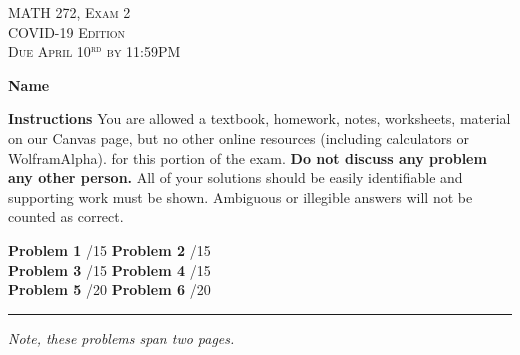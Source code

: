 \documentclass[12pt]{amsbook}
\begin{document}

\begin{center}
   \textsc{\large MATH 272, Exam 2}\\
   \textsc{COVID-19 Edition}\\
   \textsc{Due April 10$^\textrm{rd}$ by 11:59PM}
\end{center}
\vspace{1cm}

\noindent\textbf{Name} \; \underline{\hspace{8cm}}

\vspace{1cm}

\noindent\textbf{Instructions} \; You are allowed a textbook, homework, notes, worksheets, material on our Canvas page, but no other online resources (including calculators or WolframAlpha). for this portion of the exam.  \textbf{Do not discuss any problem any other person.} All of your solutions should be easily identifiable and supporting work must be shown.  Ambiguous or illegible answers will not be counted as correct. 


\vspace{1cm}

\begin{center}
\textbf{Problem 1} \; \underline{\hspace{1cm}}/15 \qquad \qquad
 \textbf{Problem 2} \; \underline{\hspace{1cm}}/15 \\
 \vspace*{.5cm}
 \textbf{Problem 3} \; \underline{\hspace{1cm}}/15 \qquad \qquad
  \textbf{Problem 4} \; \underline{\hspace{1cm}}/15\\
  \vspace*{.5cm}
  \textbf{Problem 5} \; \underline{\hspace{1cm}}/20 \qquad \qquad
   \textbf{Problem 6} \; \underline{\hspace{1cm}}/20

\end{center}

\vspace{1cm}

\hrule

\vspace*{1cm}
\noindent\emph{Note, these problems span two pages.}
\end{document}
